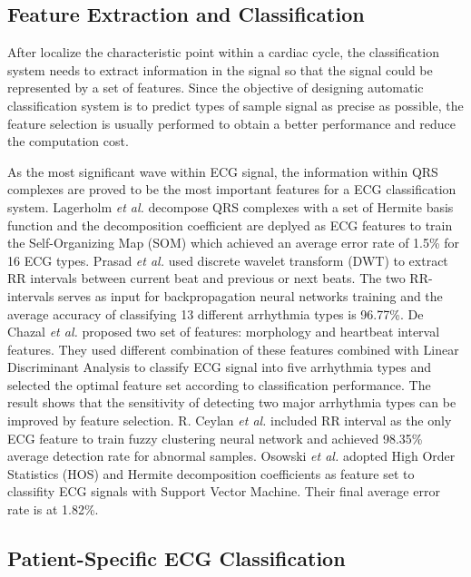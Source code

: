 \subsection{Feature Extraction and Classification}

After localize the characteristic point within a cardiac cycle, the classification system needs to extract information in the signal so that the signal could be represented by a set of features. Since the objective of designing automatic classification system is to predict types of sample signal as precise as possible, the feature selection is usually performed to obtain a better performance and reduce the computation cost. 

As the most significant wave within ECG signal, the information within QRS complexes are proved to be the most important features for a ECG classification system. Lagerholm \textit{et al.} decompose QRS complexes with a set of Hermite basis function and the decomposition coefficient are deplyed as ECG features to train the Self-Organizing Map (SOM) which achieved an average error rate of 1.5\% for 16 ECG types\cite{lagerholm2000clustering}. Prasad \textit{et al.}\cite{prasad2003classification} used discrete wavelet transform (DWT) to extract RR intervals between current beat and previous or next beats. The two RR-intervals serves as input for backpropagation neural networks training and the average accuracy of classifying 13 different arrhythmia types is 96.77\%. De Chazal \textit{et al.} proposed two set of features: morphology and heartbeat interval features. They used different combination of these features combined with Linear Discriminant Analysis to classify ECG signal into five arrhythmia types and selected the optimal feature set according to classification performance. The result shows that the sensitivity of detecting two major arrhythmia types can be improved by feature selection. R. Ceylan \textit{et al.}\cite{ceylan2009novel} included RR interval as the only ECG feature to train fuzzy clustering neural network and achieved 98.35\% average detection rate for abnormal samples. Osowski \textit{et al.} adopted High Order Statistics (HOS) and Hermite decomposition coefficients as feature set to classifity ECG signals with Support Vector Machine. Their final average error rate is at 1.82\%\cite{osowski2004support}. %

\subsection{Patient-Specific ECG Classification}

